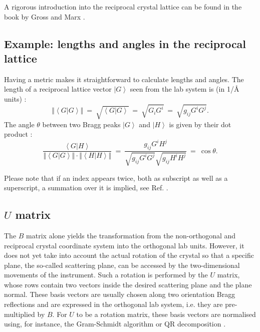 A rigorous introduction into the reciprocal crystal lattice can be found in the book by Gross
and Marx \cite[pp. 58 - 67]{Gross2012}.


\subsection{Example: lengths and angles in the reciprocal lattice}
Having a metric makes it straightforward to calculate lengths and angles.
The length of a reciprocal lattice vector $\left| G \right>$ seen from the lab system is 
(in 1/\AA{} units) \cite[p. 808]{Arens2015}:
\begin{equation}
	\left\Vert \left< G | G \right> \right\Vert \ =\  \sqrt{\left< G | G \right>}
		\ =\  \sqrt{G_i G^i} \ =\  \sqrt{g_{ij} G^i G^j}.
\end{equation}
The angle $\theta$ between two Bragg peaks $\left| G \right>$ and $\left| H \right>$ 
is given by their dot product \cite[p. 808]{Arens2015}:
\begin{equation}
	\frac{\left< G | H \right>}{\left\Vert \left< G | G \right> \right\Vert
		\cdot \left\Vert \left< H | H \right> \right\Vert} \ =\
	\frac{g_{ij} G^i H^j }{\sqrt{g_{ij} G^i G^j} \sqrt{g_{ij} H^i H^j}} \ =\  \cos \theta.
\end{equation}

Please note that if an index appears twice, both as subscript as well as a superscript, 
a summation over it is implied, see Ref. \cite{wiki_summation}.


\subsection{$U$ matrix}
The $B$ matrix alone yields the transformation from the non-orthogonal and reciprocal crystal 
coordinate system into the orthogonal lab units.
However, it does not yet take into account the actual rotation of the crystal so that a specific plane, 
the so-called scattering plane, can be accessed by the two-dimensional movements of the instrument. 
Such a rotation is performed by the $U$ matrix, whose rows contain two vectors inside the desired 
scattering plane and the plane normal. 
These basis vectors are usually chosen along two orientation Bragg reflections and are expressed 
in the orthogonal lab system, i.e. they are
pre-multiplied by $B$.
For $U$ to be a rotation matrix, these basis vectors are normalised using, for instance, the 
Gram-Schmidt algorithm \cite[p. 744]{Arens2015} \cite[pp. 269-270]{Arfken2013} or 
QR decomposition \cite[pp. 269-272]{Scarpino2011}.

